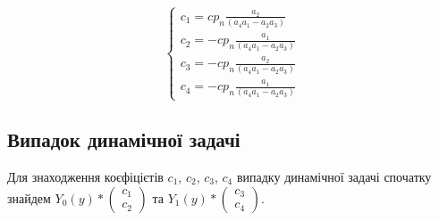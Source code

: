 \begin{equation*}
    \begin{cases}
        c_1 = c p_n \frac{a_2}{(a_4 a_1 - a_2 a_3)} \\
        c_2 = - c p_n \frac{a_1}{(a_4 a_1 - a_2 a_3)} \\
        c_3 = -c p_n \frac{a_2}{(a_4 a_1 - a_2 a_3)} \\
        c_4 = - c p_n \frac{a_1}{(a_4 a_1 - a_2 a_3)}
    \end{cases}
\end{equation*}

\subsection*{Випадок динамічної задачі}
Для знаходження коєфіцієтів $c_1$, $c_2$, $c_3$, $c_4$ випадку динамічної задачі спочатку
знайдем $Y_0(y) * \begin{pmatrix}c_1 \\ c_2\end{pmatrix}$ та $Y_1(y) * \begin{pmatrix}c_3 \\ c_4\end{pmatrix}$.